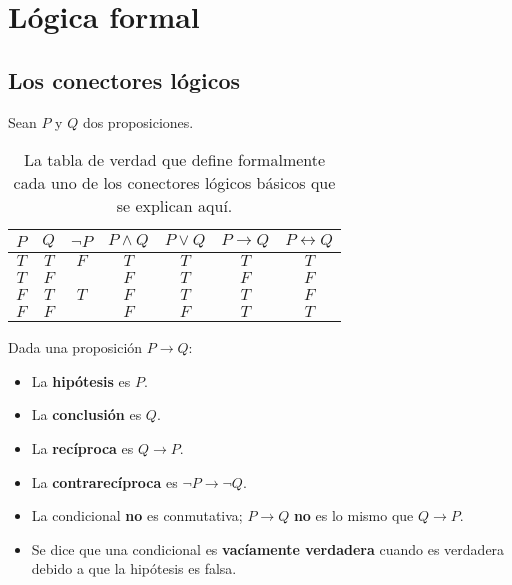 \chapter{Lógica formal}

\section{Los conectores lógicos}

Sean \(P\) y \(Q\) dos proposiciones.

\begin{table}[h]
  \caption{%
    La tabla de verdad que define formalmente cada uno de los conectores lógicos básicos que se explican aquí.
  }
  \label{tab:logical_connectors}
  \begin{centering}
    \begin{tabular}{c c c c c c c}
      \toprule
        \(P\) & \(Q\) & \(\neg P\) & \(P\land Q\) & \(P\lor Q\) & \(P\to Q\) & 
        \(P\leftrightarrow Q\) \\
      \midrule
        \(T\) & \(T\) & \(F\) & \(T\) & \(T\) & \(T\) & \(T\) \\
        \(T\) & \(F\) & & \(F\) & \(T\) & \(F\) & \(F\) \\
        \(F\) & \(T\) & \(T\) & \(F\) & \(T\) & \(T\) & \(F\) \\
        \(F\) & \(F\) & & \(F\) & \(F\) & \(T\) & \(T\) \\
      \bottomrule
    \end{tabular}
  \par\end{centering}
\end{table}


Dada una proposición \(P\to Q\):
\begin{itemize}
  \item La \textbf{hipótesis} es \(P\).
  \item La \textbf{conclusión} es \(Q\).
  \item La \textbf{recíproca} es \(Q\to P\).
  \item La \textbf{contrarecíproca} es \(\neg P\to\neg Q\).
  \item La condicional \textbf{no} es conmutativa; \(P\to Q\) \textbf{no} es lo mismo que \(Q\to P\).
  \item Se dice que una condicional es \textbf{vacíamente verdadera} cuando es verdadera debido a que la hipótesis es falsa.
\end{itemize}


